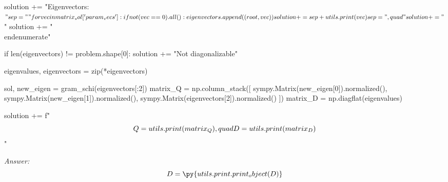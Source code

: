 \documentclass[letterpaper]{article}
\newcommand{\ans}{\textit{Answer: }}
\newenvironment{question}[2][Question]{\begin{trivlist}
\item[\hskip \labelsep {\bfseries #1}\hskip \labelsep {\bfseries #2.}]}{\end{trivlist}}
\newcommand{\printobj}[1]{\py{utils.print.print_object(#1)}}
\begin{document}
\begin{question}{6.106}
\begin{pycode}
  solution += "Eigenvectors: $"

  sep = ""
  for vec in matrix_sol['param_vecs']:
    if not (vec == 0).all():
      eigenvectors.append((root, vec))
      solution += sep + utils.print(vec)
      sep = ",\\quad"

  solution += "$\n"
solution += "\\end{enumerate}\n"

if len(eigenvectors) != problem.shape[0]:
  solution += "Not diagonalizable\n"

eigenvalues, eigenvectors = zip(*eigenvectors)

sol, new_eigen = gram_schi(eigenvectors[:2])
matrix_Q = np.column_stack([
  sympy.Matrix(new_eigen[0]).normalized(),
  sympy.Matrix(new_eigen[1]).normalized(),
  sympy.Matrix(eigenvectors[2]).normalized()
  ])
matrix_D = np.diagflat(eigenvalues)

solution += f"$$Q = {utils.print(matrix_Q)}, \\quad D = {utils.print(matrix_D)}$$\n"

  \end{pycode}

  \ans
  $$D = \printobj{D}$$

\end{question}
\end{document}
